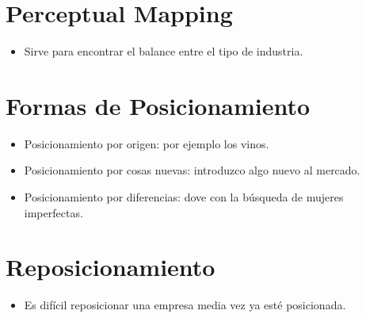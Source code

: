 \section{Perceptual Mapping}
\begin{itemize}
    \item Sirve para encontrar el balance entre el tipo de industria.
\end{itemize}


\section{Formas de Posicionamiento}
\begin{itemize}
    \item Posicionamiento por origen: por ejemplo los vinos.
    \item Posicionamiento por cosas nuevas: introduzco algo nuevo al mercado.
    \item Posicionamiento por diferencias: dove con la búsqueda de mujeres imperfectas.
\end{itemize}


\section{Reposicionamiento}
\begin{itemize}
    \item Es difícil reposicionar una empresa media vez ya esté posicionada.
\end{itemize}






